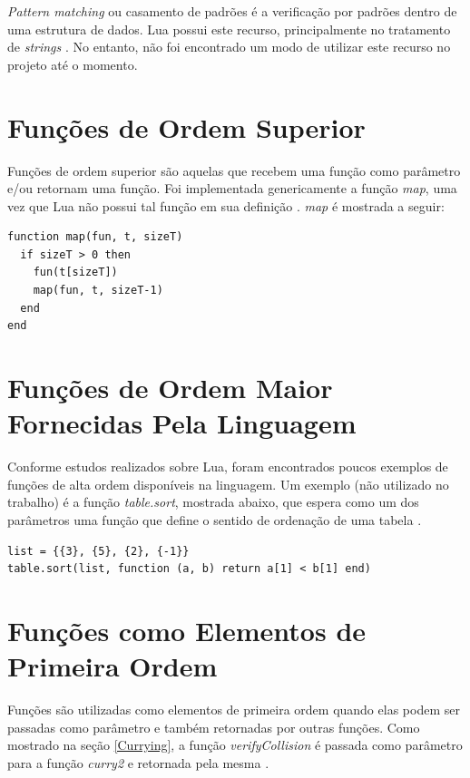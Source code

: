 \documentclass[rel_mlp]{iiufrgs}
\begin{document}
\textit{Pattern matching} ou casamento de padrões é a verificação por padrões dentro de uma estrutura de dados. Lua possui este recurso, principalmente no tratamento de \textit{strings} \cite{PatternMatchingLua}. No entanto, não foi encontrado um modo de utilizar este recurso no projeto até o momento.

\section{Funções de Ordem Superior}

Funções de ordem superior são aquelas que recebem uma função como parâmetro e/ou retornam uma função. Foi implementada genericamente a função \textit{map}, uma vez que Lua não possui tal função em sua definição \cite{HigherOrderFunctionLua}. \textit{map} é mostrada a seguir:

\begin{verbatim}
function map(fun, t, sizeT)
  if sizeT > 0 then
    fun(t[sizeT])
    map(fun, t, sizeT-1)
  end
end
\end{verbatim}

\section{Funções de Ordem Maior Fornecidas Pela Linguagem}

Conforme estudos realizados sobre Lua, foram encontrados poucos exemplos de funções de alta ordem disponíveis na linguagem. Um exemplo (não utilizado no trabalho) é a função \textit{table.sort}, mostrada abaixo, que espera como um dos parâmetros uma função que define o sentido de ordenação de uma tabela \cite{FunctionsLua}.

\begin{verbatim}
list = {{3}, {5}, {2}, {-1}}
table.sort(list, function (a, b) return a[1] < b[1] end)
\end{verbatim}

\section{Funções como Elementos de Primeira Ordem}

Funções são utilizadas como elementos de primeira ordem quando elas podem ser passadas como parâmetro e também retornadas por outras funções. Como mostrado na seção \ref{Currying}, a função \textit{verifyCollision} é passada como parâmetro para a função \textit{curry2} e retornada pela mesma \cite{FunctionsLua}.
\end{document}
